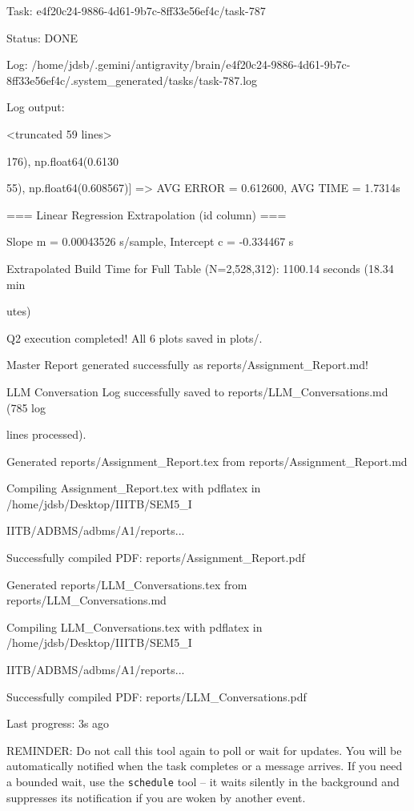 \documentclass[11pt,a4paper]{article}
\begin{document}
Task: e4f20c24-9886-4d61-9b7c-8ff33e56ef4c/task-787

Status: DONE

Log: /home/jdsb/.gemini/antigravity/brain/e4f20c24-9886-4d61-9b7c-8ff33e56ef4c/.system\_generated/tasks/task-787.log

Log output:

<truncated 59 lines>

176), np.float64(0.6130

55), np.float64(0.608567)] => AVG ERROR = 0.612600, AVG TIME = 1.7314s

=== Linear Regression Extrapolation (id column) ===

Slope m = 0.00043526 s/sample, Intercept c = -0.334467 s

Extrapolated Build Time for Full Table (N=2,528,312): 1100.14 seconds (18.34 min

utes)

Q2 execution completed! All 6 plots saved in plots/.

Master Report generated successfully as reports/Assignment\_Report.md!

LLM Conversation Log successfully saved to reports/LLM\_Conversations.md (785 log

lines processed).

Generated reports/Assignment\_Report.tex from reports/Assignment\_Report.md

Compiling Assignment\_Report.tex with pdflatex in /home/jdsb/Desktop/IIITB/SEM5\_I

IITB/ADBMS/adbms/A1/reports...

Successfully compiled PDF: reports/Assignment\_Report.pdf

Generated reports/LLM\_Conversations.tex from reports/LLM\_Conversations.md

Compiling LLM\_Conversations.tex with pdflatex in /home/jdsb/Desktop/IIITB/SEM5\_I

IITB/ADBMS/adbms/A1/reports...

Successfully compiled PDF: reports/LLM\_Conversations.pdf


Last progress: 3s ago



REMINDER: Do not call this tool again to poll or wait for updates. You will be automatically notified when the task completes or a message arrives. If you need a bounded wait, use the \texttt{schedule} tool -- it waits silently in the background and suppresses its notification if you are woken by another event.
\end{document}
